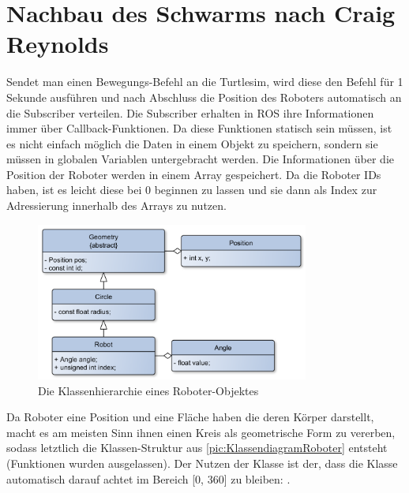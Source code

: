 \newpage
\section{Nachbau des Schwarms nach Craig Reynolds}

Sendet man einen Bewegungs-Befehl an die Turtlesim, wird diese den Befehl für 1 Sekunde ausführen und nach Abschluss die Position des Roboters automatisch an die Subscriber verteilen. Die Subscriber erhalten in \ac{ROS} ihre Informationen immer über Callback-Funktionen. Da diese Funktionen statisch sein müssen, ist es nicht einfach möglich die Daten in einem Objekt zu speichern, sondern sie müssen in globalen Variablen untergebracht werden.
Die Informationen über die Position der Roboter werden in einem Array gespeichert. Da die Roboter IDs haben, ist es leicht diese bei 0 beginnen zu lassen und sie dann als Index zur Adressierung innerhalb des Arrays zu nutzen.


\begin{figure}[h]
	\centering
	\includegraphics[width=0.8\textwidth,keepaspectratio]{graphics/Klassendiagramme/KlassendiagrammRobot.png}
	\caption{Die Klassenhierarchie eines Roboter-Objektes}
	\label{pic:KlassendiagramRoboter}
\end{figure}

Da Roboter eine Position und eine Fläche haben die deren Körper darstellt, macht es am meisten Sinn ihnen einen Kreis als geometrische Form zu vererben, sodass letztlich die Klassen-Struktur aus \autoref{pic:KlassendiagramRoboter} entsteht (Funktionen wurden ausgelassen). Der Nutzen der Klasse  ist der, dass die Klasse automatisch darauf achtet im Bereich [0, 360] zu bleiben: .


